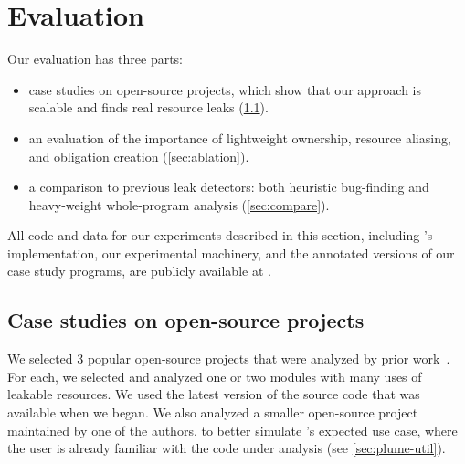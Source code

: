 \section{Evaluation}
\label{sec:evaluation}



Our evaluation has three parts:
\begin{itemize}
\item case studies on open-source projects, which show that our approach
  is scalable and finds real resource leaks (\cref{sec:case-studies}).
\item an evaluation of the importance of
  lightweight ownership, %
  resource aliasing, %
  and obligation creation %
  (\cref{sec:ablation}).
\item a comparison to previous leak detectors:  both heuristic bug-finding
  and heavy-weight whole-program
  analysis (\cref{sec:compare}).
\end{itemize}


All code and data for our experiments described
in this section, including \tool's implementation, our experimental
machinery, and the annotated versions of our case study programs,
are publicly available at .

\subsection{Case studies on open-source projects}
\label{sec:case-studies}

We selected 3 popular open-source projects that were analyzed by prior work~\cite{zuo2019grapple}.
For each, we selected and analyzed one or two modules
with many uses of leakable resources. We used
the latest version of the source code that was available
when we began. We also analyzed a smaller open-source project
maintained by one of the authors, to better simulate \tool's
expected use case, where the user is already familiar with the
code under analysis (see \cref{sec:plume-util}).


